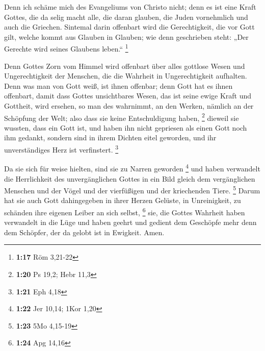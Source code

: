  Denn ich schäme mich des Evangeliums von Christo nicht;
denn es ist eine Kraft Gottes, die da selig macht alle, die daran
glauben, die Juden vornehmlich und auch die Griechen. 
Sintemal darin offenbart wird die Gerechtigkeit, die vor Gott gilt,
welche kommt aus Glauben in Glauben; wie denn geschrieben steht: „Der
Gerechte wird seines Glaubens leben.`` \footnote{\textbf{1:17} Röm
  3,21-22}

 Denn Gottes Zorn vom Himmel wird offenbart über alles
gottlose Wesen und Ungerechtigkeit der Menschen, die die Wahrheit in
Ungerechtigkeit aufhalten.  Denn was man von Gott weiß,
ist ihnen offenbar; denn Gott hat es ihnen offenbart, 
damit dass Gottes unsichtbares Wesen, das ist seine ewige Kraft und
Gottheit, wird ersehen, so man des wahrnimmt, an den Werken, nämlich an
der Schöpfung der Welt; also dass sie keine Entschuldigung haben,
\footnote{\textbf{1:20} Ps 19,2; Hebr 11,3}  dieweil sie
wussten, dass ein Gott ist, und haben ihn nicht gepriesen als einen Gott
noch ihm gedankt, sondern sind in ihrem Dichten eitel geworden, und ihr
unverständiges Herz ist verfinstert. \footnote{\textbf{1:21} Eph 4,18}

 Da sie sich für weise hielten, sind sie zu Narren
geworden \footnote{\textbf{1:22} Jer 10,14; 1Kor 1,20} 
und haben verwandelt die Herrlichkeit des unvergänglichen Gottes in ein
Bild gleich dem vergänglichen Menschen und der Vögel und der vierfüßigen
und der kriechenden Tiere. \footnote{\textbf{1:23} 5Mo 4,15-19}
 Darum hat sie auch Gott dahingegeben in ihrer Herzen
Gelüste, in Unreinigkeit, zu schänden ihre eigenen Leiber an sich
selbst, \footnote{\textbf{1:24} Apg 14,16}  sie, die
Gottes Wahrheit haben verwandelt in die Lüge und haben geehrt und
gedient dem Geschöpfe mehr denn dem Schöpfer, der da gelobt ist in
Ewigkeit. Amen.

